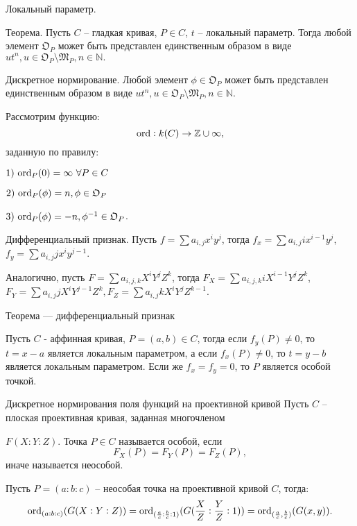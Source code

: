 \documentclass{beamer}
\begin{document}
\begin {frame} {Локальный параметр.}
\begin {block} {Теорема.}
Пусть $C$ -- гладкая кривая, $P \in C$, $t$ -- локальный параметр. Тогда любой элемент ${\mathfrak O}_P$ может быть представлен единственным образом в виде $ut^{n}, u \in  {\mathfrak O}_P \setminus {\mathfrak M}_P, n \in {\mathbb N}.$
\end {block}
\end {frame}

\begin {frame} {Дискретное нормирование.}
Любой элемент $\phi \in {\mathfrak O}_P$ может быть представлен единственным образом в виде $ut^{n}, u \in  {\mathfrak O}_P \setminus {\mathfrak M}_P, n \in {\mathbb N}.$

Рассмотрим функцию: $${\rm ord} : k(C) \to {\mathbb Z} \cup \infty,$$ заданную по правилу:

$ 1) \ {\rm ord}_P(0) = \infty \ \forall P \in C $

$ 2) \  {\rm ord}_P(\phi) = n, \phi \in {\mathfrak O}_P$

$ 3) \  {\rm ord}_P(\phi) = -n, \phi^{-1} \in {\mathfrak O}_P$.



\end {frame}

\begin {frame} {Дифференциальный признак.}
Пусть $f = \sum{a_{i,j}x^{i}y^{j}}$, тогда $f_x = \sum{a_{i,j}ix^{i-1}y^{j}}$,  $f_y = \sum{a_{i,j}jx^{i}y^{j-1}}$.

Аналогично, пусть $F = \sum{a_{i,j,k}X^{i}Y^{j}Z^{k}}$, тогда $F_X = \sum{a_{i,j,k}iX^{i-1}Y^{j}Z^{k}}$,  $F_Y = \sum{a_{i,j}jX^{i}Y^{j-1}Z^{k}}, F_Z = \sum{a_{i,j}kX^{i}Y^{j}Z^{k-1}} $.

\begin {block} {Теорема --- дифференциальный признак}

Пусть $C$ - аффинная кривая, $P=(a,b) \in C$, тогда если $f_y(P) \ne 0$, то $t=x-a$ является локальным параметром, а если $f_x(P) \ne 0$, то $t=y-b$ является локальным параметром. Если же $f_x = f_y = 0$, то $P$ является особой точкой.
\end {block}
\end {frame}

\begin {frame} {Дискретное нормирования поля функций на проективной кривой}
 Пусть $C$ -- плоская проективная кривая, заданная многочленом

 $F(X:Y:Z)$. Точка $P \in C$ называется особой, если $$F_X(P) = F_Y(P)=F_Z(P),$$ иначе называется неособой.
\newline

Пусть $P = (a : b : c)$ -- неособая точка на проективной кривой $C$, тогда:
$${\rm ord}_{(a : b : c)}(G(X : Y : Z)) = {\rm ord}_{(\frac {a}{c} :\frac {b}{c} : 1)}(G(\frac {X}{Z} : \frac {Y}{Z} : 1)) =  {\rm ord}_{(\frac {a}{c}, \frac {b}{c})}(G(x, y)).$$
\end {frame}
\end{document}
